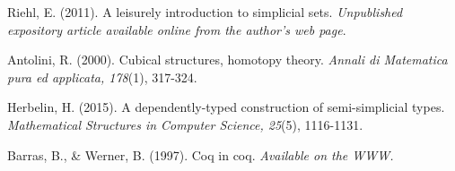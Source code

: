 \documentclass[10pt]{art.cls/art}
\begin{document}
\begin{thebibliography}{10}
  Riehl, E. (2011). A leisurely introduction to simplicial sets. \emph{Unpublished expository article available online from the author's web page}.

  Antolini, R. (2000). Cubical structures, homotopy theory. \emph{Annali di Matematica pura ed applicata, 178}(1), 317-324.

  Herbelin, H. (2015). A dependently-typed construction of semi-simplicial types. \emph{Mathematical Structures in Computer Science, 25}(5), 1116-1131.

  Barras, B., \& Werner, B. (1997). Coq in coq. \emph{Available on the WWW.}
\end{thebibliography}
\end{document}
